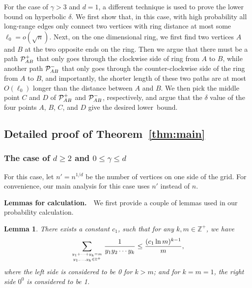 \documentclass[11pt]{article}
\newtheorem{lem}{Lemma}
\begin{document}
For the case of $\gamma > 3$ and $d=1$, a different technique is used to
	prove the lower bound on hyperbolic $\delta$.
We first show that, in this case, with high probability all long-range
	edges only connect two vertices with ring distance at most some
	$\ell_0 = o(\sqrt{n})$.
Next, on the one dimensional ring, we first find two vertices $A$ and
	$B$ at the two opposite ends on the ring.
Then we argue that there must be a path ${\cal P}_{AB}^+$ that only 
	goes through the clockwise side of ring from $A$ to $B$, 
	while another path ${\cal P}_{AB}^-$ that
	only goes through the counter-clockwise side of the ring from $A$ to $B$,
	and importantly, the shorter length of 
	these two paths are at most $O(\ell_0)$
	longer than the distance between $A$ and $B$.
We then pick the middle point $C$ and $D$ of ${\cal P}_{AB}^+$ and
	${\cal P}_{AB}^-$, respectively, and argue that the $\delta$ value
	of the four points
	$A$, $B$, $C$, and $D$ give the desired lower~bound.

\subsection{Detailed proof of Theorem~\ref{thm:main}} 
\label{sec:swproof-app}

\subsubsection{The case of $d\ge 2$ and $0\le \gamma \le d$}\label{sec:d2}

For this case, let $n'=n^{1/d}$ be the number of vertices on one side of the grid.
For convenience, our main analysis for this case uses $n'$ instead of $n$.

\vspace{\topsep}

\noindent
{\bf Lemmas for calculation.}\ \ 
We first provide a couple of lemmas used in our probability 
	calculation.

\begin{lem} \label{lemma:calc1}
There exists a constant $c_1$, such that for any $k,m\in\mathbb{Z}^+$, we
	have
\[\sum_{y_1+\cdots+y_k=m \atop y_1,\ldots,y_k\in\mathbb{Z}^+}\frac{1}{y_1y_2\cdots y_k}\leq\frac{(c_1\ln m)^{k-1}}{m},\]
where the left side is considered to be 0 for $k>m$; and for $k=m=1$, 
	the right side $0^0$ is considered to be 1.
\end{lem}
\end{document}
